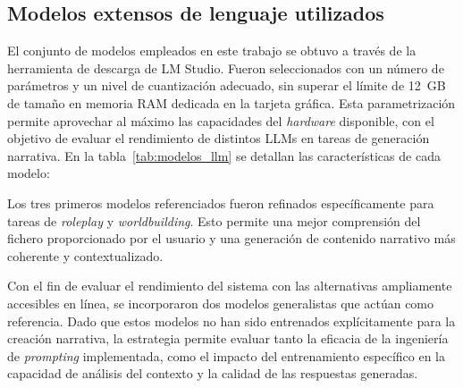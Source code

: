\subsection{Modelos extensos de lenguaje utilizados}\label{subsec:modelos-llm}
El conjunto de modelos empleados en este trabajo se obtuvo a través de la herramienta de descarga de LM Studio.
Fueron seleccionados con un número de parámetros y un nivel de cuantización adecuado,
sin superar el límite de 12~GB de tamaño en memoria RAM dedicada en la tarjeta gráfica.
Esta parametrización permite aprovechar al máximo las capacidades del \textit{hardware} disponible,
con el objetivo de evaluar el rendimiento de distintos LLMs en tareas de generación narrativa.
En la tabla~\ref{tab:modelos_llm} se detallan las características de cada modelo:

\begin{table}[h]
\centering
\caption{Modelos extensos de lenguaje utilizados en el trabajo.}
\label{tab:modelos_llm}
\end{table}

Los tres primeros modelos referenciados fueron refinados específicamente para tareas de \textit{roleplay} y \textit{worldbuilding}.
Esto permite una mejor comprensión del fichero proporcionado por el usuario y una generación de contenido narrativo más coherente y contextualizado.

Con el fin de evaluar el rendimiento del sistema con las alternativas ampliamente accesibles en línea,
se incorporaron dos modelos generalistas que actúan como referencia.
Dado que estos modelos no han sido entrenados explícitamente para la creación narrativa,
la estrategia permite evaluar tanto la eficacia de la ingeniería de \textit{prompting} implementada,
como el impacto del entrenamiento específico en la capacidad de análisis del contexto y la calidad de las respuestas generadas.

